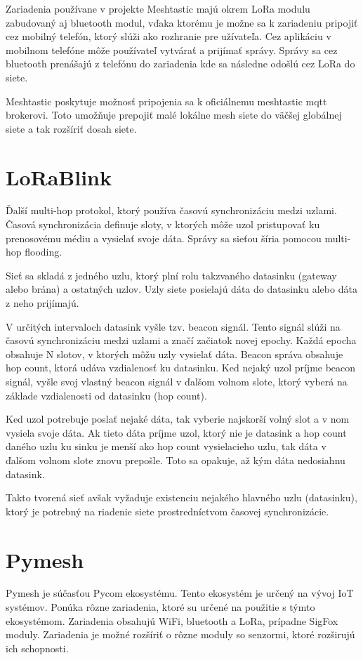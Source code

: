 \documentclass[slovak,master]{diploma}
\begin{document}
Zariadenia používane v projekte Meshtastic majú okrem LoRa modulu zabudovaný aj bluetooth modul, vďaka ktorému je možne sa k zariadeniu pripojiť cez mobilný telefón, ktorý slúži ako rozhranie pre 
užívateľa. Cez aplikáciu v mobilnom telefóne môže používateľ vytvárať a prijímať správy. Správy sa cez bluetooth prenášajú z telefónu do zariadenia kde sa následne odošlú cez 
LoRa do siete.

Meshtastic poskytuje možnosť pripojenia sa k oficiálnemu meshtastic mqtt brokerovi. Toto umožňuje prepojiť malé lokálne mesh siete do väčšej globálnej siete a 
tak rozšíriť dosah siete.

\section{LoRaBlink}
Ďalší multi-hop protokol, ktorý používa časovú synchronizáciu medzi uzlami. Časová synchronizácia definuje sloty, v ktorých môže uzol pristupovať ku prenosovému médiu a 
vysielať svoje dáta. Správy sa sieťou šíria pomocou multi-hop flooding.

Sieť sa skladá z jedného uzlu, ktorý plní rolu takzvaného datasinku (gateway alebo brána) a ostatných uzlov. Uzly siete posielajú dáta do datasinku alebo dáta z neho prijímajú.

V určitých intervaloch datasink vyšle tzv. beacon signál. Tento signál slúži na časovú synchronizáciu medzi uzlami a značí začiatok novej epochy. 
Každá epocha obsahuje N slotov, v ktorých môžu uzly vysielať dáta. Beacon správa obsahuje hop count, ktorá udáva vzdialenosť ku datasinku.
Ked nejaký uzol príjme beacon signál, vyšle svoj vlastný beacon signál v ďalšom volnom slote, ktorý vyberá na základe vzdialenosti od datasinku (hop count).

Ked uzol potrebuje poslať nejaké dáta, tak vyberie najskorší volný slot a v nom vysiela svoje dáta. Ak tieto dáta príjme uzol, ktorý nie je datasink a 
hop count daného uzlu ku sinku je menší ako hop count vysielacieho uzlu, tak dáta v ďalšom volnom slote znovu prepošle. Toto sa opakuje, až 
kým dáta nedosiahnu datasink.

Takto tvorená sieť avšak vyžaduje existenciu nejakého hlavného uzlu (datasinku), ktorý je potrebný na riadenie siete prostredníctvom časovej synchronizácie.

\section{Pymesh}
Pymesh je súčasťou Pycom \cite{pycom} ekosystému. Tento ekosystém je určený na vývoj IoT systémov. Ponúka rôzne zariadenia, ktoré su určené na použitie s týmto 
ekosystémom. Zariadenia obsahujú WiFi, bluetooth a LoRa, prípadne SigFox moduly. Zariadenia je možné rozšíriť o rôzne moduly so senzormi, ktoré rozširujú ich schopnosti.
\end{document}
